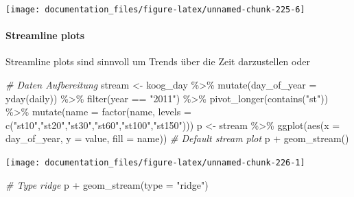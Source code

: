 \documentclass[
]{article}
\newenvironment{Shaded}{\begin{snugshade}}{\end{snugshade}}
\newcommand{\AttributeTok}[1]{\textcolor[rgb]{0.77,0.63,0.00}{#1}}
\newcommand{\CommentTok}[1]{\textcolor[rgb]{0.56,0.35,0.01}{\textit{#1}}}
\newcommand{\FunctionTok}[1]{\textcolor[rgb]{0.00,0.00,0.00}{#1}}
\newcommand{\NormalTok}[1]{#1}
\newcommand{\OtherTok}[1]{\textcolor[rgb]{0.56,0.35,0.01}{#1}}
\newcommand{\SpecialCharTok}[1]{\textcolor[rgb]{0.00,0.00,0.00}{#1}}
\newcommand{\StringTok}[1]{\textcolor[rgb]{0.31,0.60,0.02}{#1}}
\begin{document}
\begin{center}\texttt{[image: documentation\_files/figure-latex/unnamed-chunk-225-6]} \end{center}

\hypertarget{streamline-plots}{%
\paragraph{Streamline plots}\label{streamline-plots}}

Streamline plots sind sinnvoll um Trends über die Zeit darzustellen oder

\begin{Shaded}
\begin{Highlighting}[]
\CommentTok{\# Daten Aufbereitung}
\NormalTok{stream }\OtherTok{\textless{}{-}}\NormalTok{ koog\_day }\SpecialCharTok{\%\textgreater{}\%}
  \FunctionTok{mutate}\NormalTok{(}\AttributeTok{day\_of\_year =} \FunctionTok{yday}\NormalTok{(daily)) }\SpecialCharTok{\%\textgreater{}\%}
  \FunctionTok{filter}\NormalTok{(year }\SpecialCharTok{==} \StringTok{"2011"}\NormalTok{) }\SpecialCharTok{\%\textgreater{}\%}
  \FunctionTok{pivot\_longer}\NormalTok{(}\FunctionTok{contains}\NormalTok{(}\StringTok{"st"}\NormalTok{)) }\SpecialCharTok{\%\textgreater{}\%}
  \FunctionTok{mutate}\NormalTok{(}\AttributeTok{name =} \FunctionTok{factor}\NormalTok{(name, }\AttributeTok{levels =} \FunctionTok{c}\NormalTok{(}\StringTok{"st10"}\NormalTok{,}\StringTok{"st20"}\NormalTok{,}\StringTok{"st30"}\NormalTok{,}\StringTok{"st60"}\NormalTok{,}\StringTok{"st100"}\NormalTok{,}\StringTok{"st150"}\NormalTok{)))}
\NormalTok{p }\OtherTok{\textless{}{-}}\NormalTok{ stream }\SpecialCharTok{\%\textgreater{}\%}
  \FunctionTok{ggplot}\NormalTok{(}\FunctionTok{aes}\NormalTok{(}\AttributeTok{x =}\NormalTok{ day\_of\_year, }\AttributeTok{y =}\NormalTok{ value, }\AttributeTok{fill =}\NormalTok{ name))}
\CommentTok{\# Default stream plot}
\NormalTok{p }\SpecialCharTok{+} \FunctionTok{geom\_stream}\NormalTok{()}
\end{Highlighting}
\end{Shaded}

\begin{center}\texttt{[image: documentation\_files/figure-latex/unnamed-chunk-226-1]} \end{center}

\begin{Shaded}
\begin{Highlighting}[]
\CommentTok{\# Type ridge}
\NormalTok{p }\SpecialCharTok{+} \FunctionTok{geom\_stream}\NormalTok{(}\AttributeTok{type =} \StringTok{"ridge"}\NormalTok{)}
\end{Highlighting}
\end{Shaded}
\end{document}
